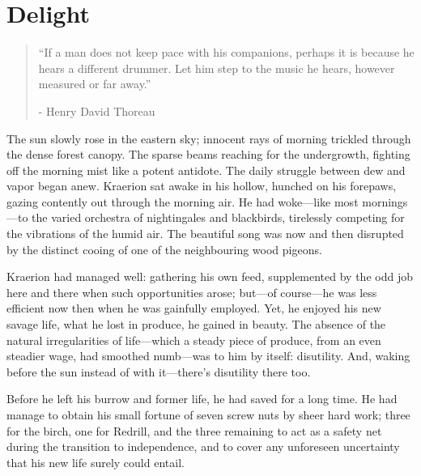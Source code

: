\chapter{Delight}

\vspace{-1.3cm}
\begin{localsize}{10}
	\begin{quote}
		“If a man does not keep pace with his companions, perhaps it is because he hears a different drummer. Let him step to the music he hears, however measured or far away.”
		\begin{flushright}- Henry David Thoreau \end{flushright}
	\end{quote} 
\end{localsize}
\vspace{1cm}

The sun slowly rose in the eastern sky; innocent rays of morning trickled through the dense forest canopy. The sparse beams reaching for the undergrowth, fighting off the morning mist like a potent antidote. The daily struggle between dew and vapor began anew. Kraerion sat awake in his hollow, hunched on his forepaws, gazing contently out through the morning air. He had woke---like most mornings---to the varied orchestra of nightingales and blackbirds, tirelessly competing for the vibrations of the humid air. The beautiful song was now and then disrupted by the distinct cooing of one of the neighbouring wood pigeons.

Kraerion had managed well: gathering his own feed, supplemented by the odd job here and there when such opportunities arose; but---of course---he was less efficient now then when he was gainfully employed. Yet, he enjoyed his new savage life, what he lost in produce, he gained in beauty. The absence of the natural irregularities of life---which a steady piece of produce, from an even steadier wage, had smoothed numb---was to him by itself: disutility. And, waking before the sun instead of with it---there's disutility there too.

\renewcommand*{\thepage}{\footnotesize \hexadecimal{page}}

Before he left his burrow and former life, he had saved for a long time. He had manage to obtain his small fortune of seven screw nuts by sheer hard work; three for the birch, one for Redrill, and the three remaining to act as a safety net during the transition to independence, and to cover any unforeseen uncertainty that his new life surely could entail.

